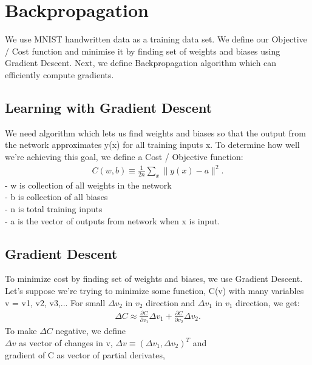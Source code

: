 \chapter{Backpropagation}
 
We use MNIST handwritten data as a training data set. We define our Objective / Cost function and minimise it by finding set of weights and biases using Gradient Descent. Next, we define Backpropagation algorithm which can efficiently compute gradients.

\section{Learning with Gradient Descent}
We need algorithm which lets us find weights and biases so that the output from the network approximates y(x) for all training inputs x. 
To determine how well we're achieving this goal, we define a Cost / Objective function:\\
\begin{eqnarray}  C(w,b) \equiv
\frac{1}{2n} \sum_x \| y(x) - a\|^2.
\end{eqnarray}
- w is collection of all weights in the network\\
- b is collection of all biases\\
- n is total training inputs\\
- a is the vector of outputs from network when x is input.\\

\section{Gradient Descent}
To minimize cost by finding set of weights and biases, we use Gradient Descent.
Let's suppose we're trying to minimize some function, C(v) with many variables v = v1, v2, v3,... For small $\Delta v_{2}$ in $v_{2}$ direction and $\Delta v_{1}$ in $v_{1}$ direction, we get:
\begin{eqnarray} 
\Delta C \approx \frac{\partial C}{\partial v_1} \Delta v_1 +
\frac{\partial C}{\partial v_2} \Delta v_2.
\end{eqnarray}
To make $\Delta C$ negative, we define \\
$\Delta v$ as vector of changes in v,  
$\Delta v \equiv (\Delta v_1, \Delta v_2)^T$ and  \\
gradient of C as vector of partial derivates,

